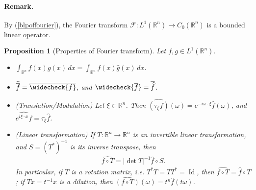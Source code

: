 \documentclass{article}
\numberwithin{equation}{section}
\newcommand{\bbR}{\mathbb{R}}
\renewcommand{\cal}{\mathcal}
\newcommand{\ol}{\overline}
\newcommand{\wh}{\widehat}
\DeclareMathOperator{\id}{Id}
\theoremstyle{plain}
\newtheorem{proposition}[theorem]{Proposition}
\theoremstyle{definition}
\begin{document}
\paragraph{Remark.} By (\ref{blpoffourier}), the Fourier transform $\cal{F}:L^1(\bbR^n)\to C_0(\bbR^n)$ is a bounded linear operator.

\begin{proposition}[Properties of Fourier transform]
Let $f,g\in L^1(\bbR^n)$.
\begin{itemize}
\item[(i)] $\int_{\bbR^n}\wh{f}(x)g(x)\,dx=\int_{\bbR^n}f(x)\wh{g}(x)\,dx$.
\item[(ii)] $\wh{\ol{f}}=\ol{\widecheck{f}}$, and $\widecheck{\ol{f}}=\ol{\wh{f}}$.
\item[(iii)] (Translation/Modulation) Let $\xi\in\bbR^n$. Then $\wh{(\tau_\xi f)}(\omega)=e^{-i\omega\cdot\xi}\wh{f}(\omega)$, and $\wh{e^{i\xi\cdot x}f}=\tau_\xi\wh{f}$.
\item[(iv)] (Linear transformation) If $T:\bbR^n\to\bbR^n$ is an invertible linear transformation, and $S=(T^*)^{-1}$ is its inverse transpose, then
\begin{align*}
	\wh{f\circ T}=\left\vert\det T\right\vert^{-1}\wh{f}\circ S.
\end{align*}
In particular, if $T$ is a rotation matrix, i.e. $T^*T=TT^*=\id$, then $\wh{f\circ T}=\wh{f}\circ T$; if $Tx=t^{-1}x$ is a dilation, then $\wh{(f\circ T)}(\omega)=t^n\wh{f}(t\omega)$.
\end{itemize}
\end{proposition}
\end{document}

